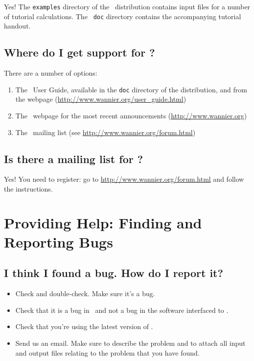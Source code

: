 Yes! The {\tt examples} directory of the \wannier\ distribution
contains input files for a number of tutorial calculations. The {\tt
  doc} directory contains the accompanying tutorial handout. 

\subsection{Where do I get support for \wannier?}

There are a number of options:

\begin{enumerate}
\item The \wannier\ User Guide, available in the {\tt doc} directory of the
  distribution, and from the webpage (\url{http://www.wannier.org/user\_guide.html})
\item The \wannier\ webpage for the most recent announcements (\url{http://www.wannier.org})
\item The \wannier\ mailing list (see \url{http://www.wannier.org/forum.html})
\end{enumerate}

\subsection{Is there a mailing list for \wannier?}

Yes! You need to register: go to \url{http://www.wannier.org/forum.html} and
follow the instructions. 

\section{Providing Help: Finding and Reporting Bugs}

\subsection{I think I found a bug. How do I report it?}

\begin{itemize}
\item Check and double-check. Make sure it's a bug.
\item Check that it is a bug in \wannier\ and not a bug in the
  software interfaced to \wannier.
\item Check that you're using the latest version of \wannier.
\item Send us an email. Make sure to
  describe the problem and to attach all input and output files
  relating to the problem that you have found.
\end{itemize}

